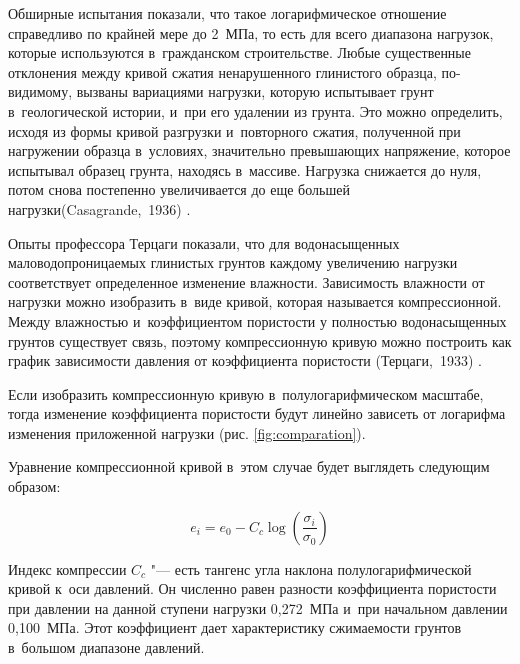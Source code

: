 Обширные испытания показали, что такое логарифмическое отношение справедливо по крайней мере до 2~МПа, то есть для всего диапазона нагрузок, которые используются в~гражданском строительстве.
Любые существенные отклонения между кривой сжатия ненарушенного глинистого образца, по-видимому, вызваны вариациями нагрузки, которую испытывает грунт в~геологической истории, и~при его удалении из грунта.
Это можно определить, исходя из формы кривой разгрузки и~повторного сжатия, полученной при нагружении образца в~условиях, значительно превышающих напряжение, которое испытывал образец грунта, находясь в~массиве.
Нагрузка снижается до нуля, потом снова постепенно увеличивается до еще большей нагрузки(Casagrande,~1936) \cite{cazagrande1936}.

 Опыты профессора Терцаги показали, что для водонасыщенных маловодопроницаемых глинистых грунтов каждому увеличению нагрузки соответствует определенное изменение влажности. 
 Зависимость влажности от нагрузки можно изобразить в~виде кривой,
 которая называется компрессионной. 
 Между влажностью и~коэффициентом пористости у полностью водонасыщенных грунтов существует связь, поэтому компрессионную кривую можно построить как график зависимости давления от коэффициента пористости (Терцаги,~1933) \cite{terz1933}.



 Если изобразить компрессионную кривую в~полулогарифмическом масштабе, 
 тогда изменение коэффициента пористости будут линейно зависеть от логарифма изменения приложенной нагрузки (рис. \ref{fig:comparation}).

 \begin{sidewaysfigure}[p]
  \label{fig:comparation}
  \centering
  \small
  
  \caption{Сравнение компрессионой кривой в~линейном и~логарифмическом масштабе,(Casagrande, 1936) \cite{cazagrande1936}}
 \end{sidewaysfigure}


 Уравнение компрессионной кривой в~этом случае будет выглядеть следующим образом:
 
 \begin{equation}
 e_i=e_0-C_c \log \left( \frac{\sigma_i}{\sigma_0} \right)
 \label{eq:ke}
 \end{equation}
 
 Индекс компрессии $C_c$ "--- есть тангенс угла наклона полулогарифмической кривой к~оси давлений. Он численно равен разности коэффициента пористости при давлении на данной ступени нагрузки 0,272~МПа и~при начальном давлении 0,100~МПа. Этот коэффициент дает характеристику сжимаемости грунтов в~большом диапазоне давлений. 
 
